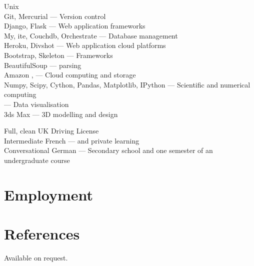 \documentclass[10pt]{article}
\begin{document}
        {
            Unix\\
            Git, Mercurial --- Version control\\
            Django, Flask --- Web application frameworks\\
            My, ite, Couchdb, Orchestrate --- Database management\\
            Heroku, Divshot --- Web application cloud platforms\\
            Bootstrap, Skeleton ---  Frameworks\\
            BeautifulSoup ---  parsing\\
            Amazon ,  --- Cloud computing and storage\\
            Numpy, Scipy, Cython, Pandas, Matplotlib, IPython --- Scientific and numerical computing\\
             --- Data visualisation\\
            3ds Max --- 3D modelling and design
        }


        {
            Full, clean UK Driving License\\
            Intermediate French ---   and private learning\\
            Conversational German --- Secondary school and one semester of an undergraduate course\\
        }

    \section{Employment}




    \section{References}

        Available on request.
\end{document}
